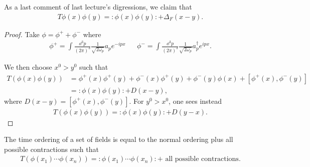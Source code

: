 

\newcommand{\nord}[1]{:\mathrel{#1}:}

\begin{claim}
    As a last comment of last lecture's digressions, we claim that
\begin{align}
    T \phi \left( x \right) \phi \left( y \right) = \nord{ \phi \left( x \right) \phi \left( y \right) } + \Delta_F \left( x - y \right) 
.\end{align}
\end{claim}


\begin{proof}
    Take $\phi = \phi^{+} + \phi^{-}$ where
    \begin{align}
        \phi^{+} = \int \frac{\dd{^3p}}{\left( 2\pi \right)^3} \frac{1}{\sqrt{2\omega_p} } a_p e^{-i p x} && \phi^{-} = \int \frac{\dd{^3p}}{\left( 2\pi \right)^3} \frac{1}{\sqrt{2\omega_p} } a_p^{\dag} e^{i px}
    .\end{align}

    We then choose $x^{0} > y^{0}$ such that
    \begin{align}
        T \left( \phi \left( x \right) \phi \left( y \right)  \right) &= \phi^{+} \left( x \right) \phi^{+} \left( y \right) + \phi^{-}\left( x \right) \phi^{+}\left( y \right) + \phi^{-}\left( y \right) \phi\left( x \right) + \left[ \phi^{+}\left( x \right) , \phi^{-}\left( y \right)  \right]  \\
        &=  \nord{ \phi \left( x \right) \phi \left( y \right)} + D \left( x - y \right)
    ,\end{align}
    where $D \left( x - y \right) = \left[ \phi^{+} \left( x \right) , \phi^{-}\left( y \right)  \right] $.
    For $y^{0} > x^{0}$, one sees instead
    \begin{align}
        T \left( \phi \left( x \right) \phi \left( y \right)  \right) = \nord{ \phi \left( x \right) \phi \left( y \right) } + D \left( y - x \right) 
    .\end{align}
\end{proof}


\begin{theorem}
    The time ordering of a set of fields is equal to the normal ordering plus all possible contractions such that
    \begin{align}
        T \left( \phi \left( x_1 \right) \cdots \phi \left( x_{n} \right)  \right) = \nord{ \phi \left( x_1 \right) \cdots \phi \left( x_{n} \right)} + \text{~all possible contractions}
    .\end{align}
\end{theorem}

